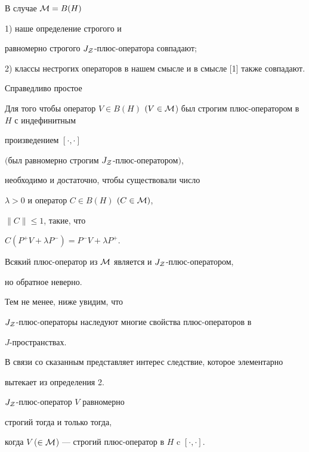 В случае ${\cal M}=B(H)$





1) наше определение строгого и 


равномерно строгого $J_{\cal Z}$-плюс-оператора совпадают;





2) классы нестрогих операторов в нашем смысле и в смысле [1] также совпадают. 





\noindent{}Справедливо простое





\begin{prop}


Для того чтобы оператор $V\in B(H)$ $(V\in


\cal M$) был строгим плюс-опе\-ра\-то\-ром в $H$ с индефинитным 


произведением $[\cdot,\cdot]$


$($был равномерно строгим $J_{\cal Z}$-плюс-опе\-ра\-то\-ром$)$,


необходимо и достаточно, чтобы существовали число


$\lambda >0$ и оператор $C\in B(H)$ $(C\in {\cal M})$,


$\| C\| \leq 1$, такие, что


$C(P^{+}V+\lambda P^{-})= P^{-}V+\lambda P^{+}$.


\end{prop}








Всякий плюс-оператор из $\cal M$ является и $J_{\cal Z}$-плюс-оператором, 


но обратное неверно. 


Тем не менее, ниже увидим, что


$J_{\cal Z}$-плюс-операторы наследуют многие свойства плюс-операторов в


$J$-пространствах.


В связи со сказанным представляет интерес следствие, которое элементарно 


вытекает из определения 2.





\begin{cor}


$J_{\cal Z}$-плюс-оператор $V$ равномерно 


строгий тогда и только тогда,


когда $V$ ($\in {\cal M}$) --- строгий плюс-оператор в $H$ c $[\cdot,\cdot]$.


\end{cor}





